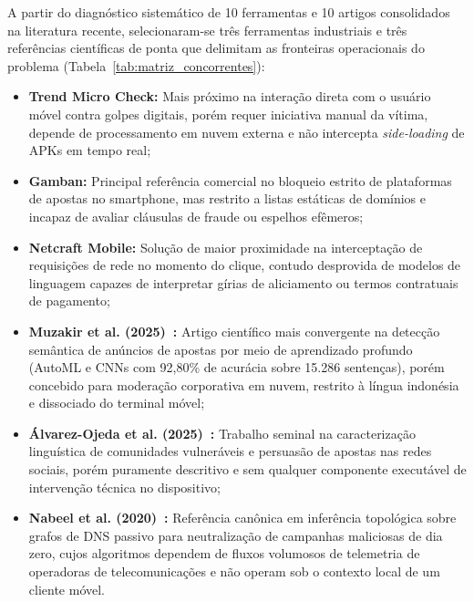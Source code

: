 A partir do diagn\'{o}stico sistem\'{a}tico de 10 ferramentas e 10 artigos consolidados na literatura recente, selecionaram-se tr\^{e}s ferramentas industriais e tr\^{e}s refer\^{e}ncias cient\'{i}ficas de ponta que delimitam as fronteiras operacionais do problema (Tabela~\ref{tab:matriz_concorrentes}):
\begin{itemize}
    \item \textbf{Trend Micro Check:} Mais pr\'{o}ximo na intera\c{c}\~{a}o direta com o usu\'{a}rio m\'{o}vel contra golpes digitais, por\'{e}m requer iniciativa manual da v\'{i}tima, depende de processamento em nuvem externa e n\~{a}o intercepta \textit{side-loading} de APKs em tempo real;
    \item \textbf{Gamban:} Principal refer\^{e}ncia comercial no bloqueio estrito de plataformas de apostas no smartphone, mas restrito a listas est\'{a}ticas de dom\'{i}nios e incapaz de avaliar cl\'{a}usulas de fraude ou espelhos ef\^{e}meros;
    \item \textbf{Netcraft Mobile:} Solu\c{c}\~{a}o de maior proximidade na intercepta\c{c}\~{a}o de requisi\c{c}\~{o}es de rede no momento do clique, contudo desprovida de modelos de linguagem capazes de interpretar g\'{i}rias de aliciamento ou termos contratuais de pagamento;
    \item \textbf{Muzakir et al. (2025)~\cite{muzakir2025text}:} Artigo cient\'{i}fico mais convergente na detec\c{c}\~{a}o sem\^{a}ntica de an\'{u}ncios de apostas por meio de aprendizado profundo (AutoML e CNNs com 92,80\% de acur\'{a}cia sobre 15.286 senten\c{c}as), por\'{e}m concebido para modera\c{c}\~{a}o corporativa em nuvem, restrito \`{a} l\'{i}ngua indon\'{e}sia e dissociado do terminal m\'{o}vel;
    \item \textbf{\'{A}lvarez-Ojeda et al. (2025)~\cite{alvarezojeda2025precom}:} Trabalho seminal na caracteriza\c{c}\~{a}o lingu\'{i}stica de comunidades vulner\'{a}veis e persuas\~{a}o de apostas nas redes sociais, por\'{e}m puramente descritivo e sem qualquer componente execut\'{a}vel de interven\c{c}\~{a}o t\'{e}cnica no dispositivo;
    \item \textbf{Nabeel et al. (2020)~\cite{nabeel2020following}:} Refer\^{e}ncia can\^{o}nica em infer\^{e}ncia topol\'{o}gica sobre grafos de DNS passivo para neutraliza\c{c}\~{a}o de campanhas maliciosas de dia zero, cujos algoritmos dependem de fluxos volumosos de telemetria de operadoras de telecomunica\c{c}\~{o}es e n\~{a}o operam sob o contexto local de um cliente m\'{o}vel.
\end{itemize}

